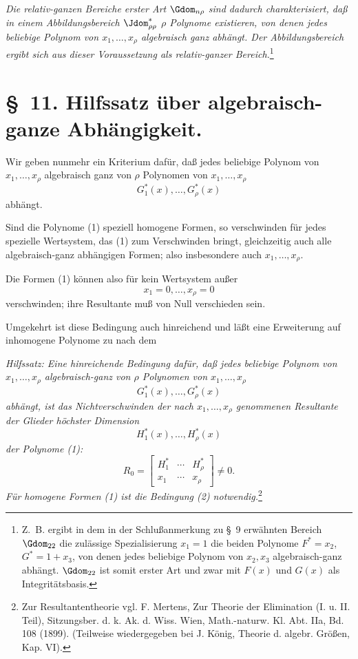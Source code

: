 \documentclass[11pt]{article}
\begin{document}
\emph{Die relativ-ganzen Bereiche erster Art $\Gdom_{n\rho}$ sind dadurch charakterisiert, daß in einem Abbildungsbereich $\Jdom^*_{\rho\rho}$ $\rho$ Polynome existieren, von denen jedes beliebige Polynom von $x_1,
\ldots,x_\rho$ algebraisch ganz abhängt. Der Abbildungsbereich ergibt sich aus dieser Voraussetzung als relativ-ganzer Bereich.}\footnote{Z.~B. ergibt in dem in der Schlußanmerkung zu \S\ 9 erwähnten Bereich $\Gdom_{22}$ die zulässige Spezialisierung $x_1=1$ die beiden Polynome $F^*=x_2$, $G^*=1+x_3$, von denen jedes beliebige Polynom von $x_2,x_3$ algebraisch-ganz abhängt. $\Gdom_{22}$ ist somit erster Art und zwar mit $F(x)$ und $G(x)$ als Integritätsbasis.}

\section*{\S\ 11. Hilfssatz über algebraisch-ganze Abhängigkeit.}

Wir geben nunmehr ein Kriterium dafür, daß jedes beliebige Polynom von $x_1,
\ldots,x_\rho$ algebraisch ganz von $\rho$ Polynomen von $x_1,
\ldots,x_\rho$
\begin{equation}
  G_1^*(x),\ldots,G_\rho^*(x)
\tag{1}
\end{equation}
abhängt.

Sind die Polynome (1) speziell homogene Formen, so verschwinden für jedes spezielle Wertsystem, das (1) zum Verschwinden bringt, gleichzeitig auch alle algebraisch-ganz abhängigen Formen; also insbesondere auch $x_1,
\ldots,x_\rho$.

Die Formen (1) können also für kein Wertsystem außer
\[
  x_1=0,
  \ldots,
  x_\rho=0
\]
verschwinden; ihre Resultante muß von Null verschieden sein.

Umgekehrt ist diese Bedingung auch hinreichend und läßt eine Erweiterung auf inhomogene Polynome zu nach dem

\emph{Hilfssatz: Eine hinreichende Bedingung dafür, daß jedes beliebige Polynom von $x_1,
\ldots,x_\rho$ algebraisch-ganz von $\rho$ Polynomen von $x_1,
\ldots,x_\rho$
\[
  G_1^*(x),\ldots,G_\rho^*(x)
\]
abhängt, ist das Nichtverschwinden der nach $x_1,
\ldots,x_\rho$ genommenen Resultante der Glieder höchster Dimension}
\[
  H_1^*(x),\ldots,H_\rho^*(x)
\]
\emph{der Polynome (1):}
\begin{equation}
  R_0=\left[
  \begin{array}{ccc}
    H_1^*&\cdots&H_\rho^*\\
    x_1&\cdots&x_\rho
  \end{array}
  \right]\ne0.
\tag{2}
\end{equation}
\emph{Für homogene Formen (1) ist die Bedingung (2) notwendig.}\footnote{Zur Resultantentheorie vgl. F. Mertens, Zur Theorie der Elimination (I. u. II. Teil), Sitzungsber. d. k. Ak. d. Wiss. Wien, Math.-naturw. Kl. Abt. IIa, Bd. 108 (1899). (Teilweise wiedergegeben bei J. König, Theorie d. algebr. Größen, Kap. VI).}
\end{document}
